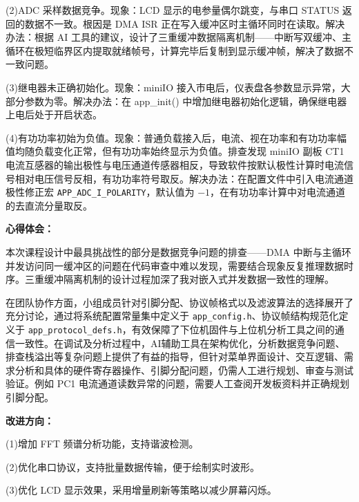 \documentclass[UTF8,a4paper,zihao=-4,fontset=macnew]{ctexart}
\begin{document}
(2)ADC 采样数据竞争。现象：LCD 显示的电参量偶尔跳变，与串口 STATUS 返回的数据不一致。根因是 DMA ISR 正在写入缓冲区时主循环同时在读取。解决办法：根据 AI 工具的建议，设计了三重缓冲数据隔离机制——中断写双缓冲、主循环在极短临界区内提取就绪帧号，计算完毕后复制到显示缓冲帧，解决了数据不一致问题。

(3)继电器未正确初始化。现象：miniIO 接入市电后，仪表盘各参数显示异常，大部分参数为零。解决办法：在 app\_init() 中增加继电器初始化逻辑，确保继电器上电后处于开启状态。

(4)有功功率初始为负值。现象：普通负载接入后，电流、视在功率和有功功率幅值均随负载变化正常，但有功功率始终显示为负值。排查发现 miniIO 副板 CT1 电流互感器的输出极性与电压通道传感器相反，导致软件按默认极性计算时电流信号相对电压信号反相，有功功率符号取反。解决办法：在配置文件中引入电流通道极性修正宏 \texttt{APP\_ADC\_I\_POLARITY}，默认值为 $-1$，在有功功率计算中对电流通道的去直流分量取反。

\textbf{心得体会：}

本次课程设计中最具挑战性的部分是数据竞争问题的排查——DMA 中断与主循环并发访问同一缓冲区的问题在代码审查中难以发现，需要结合现象反复推理数据时序。三重缓冲隔离机制的设计过程加深了我对嵌入式并发数据一致性的理解。

在团队协作方面，小组成员针对引脚分配、协议帧格式以及滤波算法的选择展开了充分讨论，通过将系统配置常量集中定义于 \texttt{app\_config.h}、协议帧结构规范化定义于 \texttt{app\_protocol\_defs.h}，有效保障了下位机固件与上位机分析工具之间的通信一致性。在调试及分析过程中，AI辅助工具在架构优化，分析数据竞争问题、排查栈溢出等复杂问题上提供了有益的指导，但针对菜单界面设计、交互逻辑、需求分析和具体的硬件寄存器操作、引脚分配问题，仍需人工进行规划、审查与测试验证。例如 PC1 电流通道读数异常的问题，需要人工查阅开发板资料并正确规划引脚分配。

\textbf{改进方向：}

(1)增加 FFT 频谱分析功能，支持谐波检测。

(2)优化串口协议，支持批量数据传输，便于绘制实时波形。

(3)优化 LCD 显示效果，采用增量刷新等策略以减少屏幕闪烁。
\end{document}
